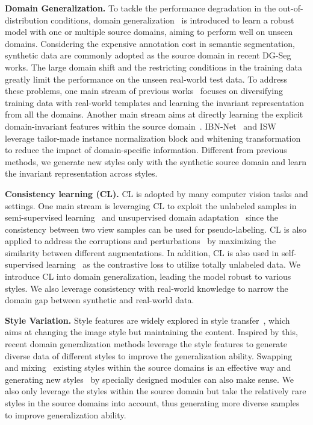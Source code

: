 \documentclass[runningheads]{llncs}
\begin{document}
\noindent\textbf{Domain Generalization.} 
To tackle the performance degradation in the out-of-distribution conditions, domain generalization~\cite{FSDR,DRPC,robustnet,meng2022attention,zhou2021mixstyle} is introduced to learn a robust model with one or multiple source domains, aiming to perform well on unseen domains. Considering the expensive annotation cost in semantic segmentation, synthetic data are commonly adopted as the source domain in recent DG-Seg works. 
The large domain shift and the restricting conditions in the training data greatly limit the performance on the unseen real-world test data.
To address these problems, one main stream of previous works~\cite{FSDR,DRPC} focuses on diversifying training data with real-world templates and learning the invariant representation from all the domains. Another main stream aims at directly learning the explicit domain-invariant features within the source domain~\cite{robustnet,ibn,crossnorm}. IBN-Net~\cite{ibn} and ISW~\cite{robustnet} leverage tailor-made instance normalization block and whitening transformation to reduce the impact of domain-specific information. 
Different from previous methods, we generate new styles only with the synthetic source domain and learn the invariant representation across styles.


\noindent\textbf{Consistency learning (CL).}
CL is adopted by many computer vision tasks and settings. One main stream is leveraging CL to exploit the unlabeled samples in semi-supervised learning~\cite{french2019semi,tarvainen2017mean} and unsupervised domain adaptation~\cite{pan2020unsupervised,zou2018unsupervised,zhou2022uncertainty} since the consistency between two view samples can be used for pseudo-labeling. CL is also applied to address the corruptions and perturbations~\cite{hendrycks2020augmix,wang2021augmax} by maximizing the similarity between different augmentations.
In addition, CL is also used in self-supervised learning~\cite{simclr,moco} as the contrastive loss to utilize totally unlabeled data.
We introduce CL into domain generalization, leading the model robust to various styles. We also leverage consistency with real-world knowledge to narrow the domain gap between synthetic and real-world data. 

\noindent\textbf{Style Variation.}
Style features are widely explored in style transfer~\cite{dumoulin2016learned,adain}, which aims at changing the image style but maintaining the content. 
Inspired by this, recent domain generalization methods leverage the style features to generate diverse data of different styles to improve the generalization ability.
Swapping~\cite{crossnorm,zhao2022sfocda} and mixing~\cite{zhou2021mixstyle} existing styles within the source domains is an effective way and generating new styles~\cite{wang2021L2D} by specially designed modules can also make sense. 
We also only leverage the styles within the source domain but take the relatively rare styles in the source domains into account, thus generating more diverse samples to improve generalization ability.
\end{document}

